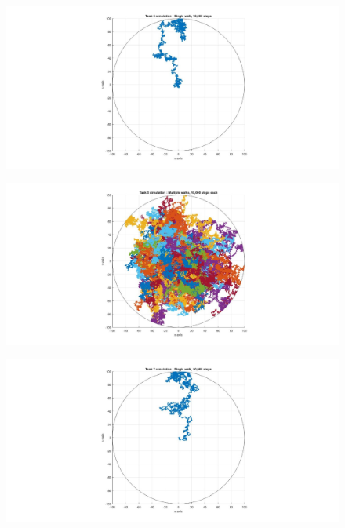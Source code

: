 \documentclass[10pt, a4paper]{article}
\begin{document}
\begin{figure}[H]
    \includegraphics[width=\textwidth]{Task 5 Testing/single_walk_task_5.jpeg}
    \caption{}
    \label{fig:6}
\end{figure}

\begin{figure}[H]
    \includegraphics[width=\textwidth]{Task 5 Testing/multiple_walks_task_5.jpeg}
    \caption{}
    \label{fig:7}
\end{figure}

\begin{figure}[H]
    \includegraphics[width=\textwidth]{Task 7 Testing/single_walk_task_7.jpeg}
    \caption{}
    \label{fig:8}
\end{figure}
\end{document}
